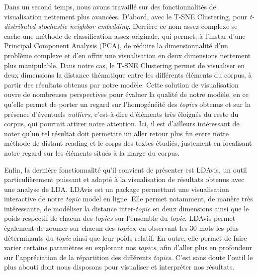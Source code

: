 \documentclass[letterpaper,portrait,12pt]{article}
\begin{document}
	Dans un second temps, nous avons travaill\'{e} sur des fonctionnalit\'{e}s de visualisation nettement plus avanc\'{e}es. D'abord, avec le T-SNE Clustering, pour \emph{t-distributed stochastic neighbor embedding}. Derri\`{e}re ce nom assez complexe se cache une m\'{e}thode de classification assez originale, qui permet, \`{a} l'instar d'une Principal Component Analysis (PCA), de r\'{e}duire la dimensionnalit\'{e} d'un probl\`{e}me complexe et d'en offrir une visualisation en deux dimensions nettement plus manipulable. Dans notre cas, le T-SNE Clustering permet de visualiser en deux dimensions la distance th\'{e}matique entre les diff\'{e}rents \'{e}l\'{e}ments du corpus, \`{a} partir des r\'{e}sultats obtenus par notre mod\`{e}le. Cette solution de visualisation ouvre de nombreuses perspectives pour \'{e}valuer la qualit\'{e} de notre mod\`{e}le, en ce qu'elle permet de porter un regard sur l'homog\'{e}n\'{e}it\'{e} des \emph{topics} obtenus et sur la pr\'{e}sence d'\'{e}ventuels \emph{outliers}, c'est-\`{a}-dire d'\'{e}l\'{e}ments tr\`{e}s \'{e}loign\'{e}s du reste du corpus, qui pourrait attirer notre attention. Ici, il est d'ailleurs int\'{e}ressant de noter qu'un tel r\'{e}sultat doit permettre un aller retour plus fin entre notre m\'{e}thode de distant reading et le corps des textes \'{e}tudi\'{e}s, justement en focalisant notre regard sur les \'{e}l\'{e}ments situ\'{e}s \`{a} la marge du corpus.





	Enfin, la derni\`{e}re fonctionnalit\'{e} qu'il convient de pr\'{e}senter est LDAvis, un outil particuli\`{e}rement puissant et adapt\'{e} \`{a} la visualisation de r\'{e}sultats obtenus avec une analyse de LDA. LDAvis est un package permettant une visualisation interactive de notre \emph{topic} model en ligne. Elle permet notamment, de man\`{e}re tr\`{e}s int\'{e}ressante, de mod\'{e}liser la distance inter-\emph{topic} en deux dimensions ainsi que le poids respectif de chacun des \emph{topics} sur l'ensemble du \emph{topic}. LDAvis permet \'{e}galement de zoomer sur chacun des \emph{topics}, en observant les 30 mots les plus d\'{e}terminants du \emph{topic} ainsi que leur poids relatif. En outre, elle permet de faire varier certains param\`{e}tres en explorant nos \emph{topics}, afin d'aller plus en profondeur sur l'appr\'{e}ciation de la r\'{e}partition des diff\'{e}rents \emph{topics}. C'est sans doute l'outil le plus abouti dont nous disposons pour visualiser et interpr\'{e}ter nos r\'{e}sultats. 
\end{document}
